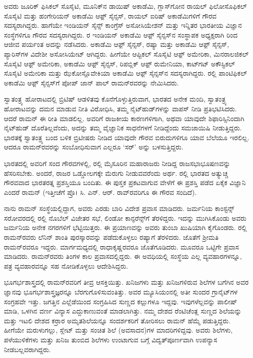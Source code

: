ಅವರು ಜೂರಿಕ್ ಫಿಸಿಕಲ್ ಸೊಸೈಟಿ, ಮೂನಿಕ್‌ನ ಡಾಯಿಷ್ ಅಕಾಡೆಮಿ, ಗ್ಲಾಸ್‌ಗೋನ ರಾಯಲ್ ಫಿಲೋಸೊಫಿಕಲ್ ಸೊಸೈಟಿ ಮತ್ತು ಹಂಗೇರಿಯನ್ ಅಕಾಡೆಮಿ ಆಫ಼್ ಸೈನ್ಸಸ್, ರಾಯಲ್ ಐರಿಷ್ ಅಕಾಡೆಮಿಗಳಿಗೆ ಗೌರವ ಸದಸ್ಯರಾಗಿದ್ದರು. ಹಾಗೆಯೇ ಇಂಡಿಯನ್ ಸೈನ್ಸ್ ಕಾಂಗ್ರೆಸ್ ಅಸೋಸಿಯೇಶನ್ ಮತ್ತು ಇನ್ನಿತರ ಭಾರತೀಯ ವಿಜ್ಞಾನ ಸಂಸ್ಥೆಗಳಿಗೂ ಗೌರವ ಸದಸ್ಯರಾಗಿದ್ದರು.  ರ ಇಂಡಿಯನ್ ಅಕಾಡೆಮಿ ಆಫ಼್ ಸೈನ್ಸಸ್‌ನ ಸಂಸ್ಥಾಪಕ ಅಧ್ಯಕ್ಷರಾಗಿ  ರಿಂದ ಆಜೀವ ಪರ್ಯಂತ ಅದನ್ನು ನಡೆಸಿದರು. ಅಕಾಡೆಮಿ ಆಫ಼್ ಸೈನ್ಸಸ್, ರಷ್ಯಾ ಮತ್ತು ಅಕಾಡೆಮಿ ಆಫ಼್ ಸೈನ್ಸಸ್, ಪ್ಯಾರಿಸ್‍ಗಳ ವಿದೇಶೀ ಅಸೋಸಿಯೇಟ್ ಆಗಿದ್ದರು. ಹೀಗೆಯೇ ಆಪ್ಟಿಕಲ್ ಸೊಸೈಟಿ ಆಫ಼್ ಅಮೇರಿಕಾ, ಮಿನರಾಲಜಿಕಲ್ ಸೊಸೈಟಿ ಆಫ಼್ ಅಮೇರಿಕಾ, ಅಕಾಡೆಮಿ ಆಫ಼್ ಸೈನ್ಸಸ್, ರಿಪಬ್ಲಿಕ್ ಆಫ಼್ ರುಮೇನಿಯಾ, ಕಾಟ್‍ಗಟ್ ಅಕೌಸ್ಟಿಕಲ್ ಸೊಸೈಟಿ ಅಮೇರಿಕಾ ಮತ್ತು ಝೆಕೋಸ್ಲೊವೇಕಿಯಾ ಅಕಾಡೆಮಿ ಆಫ಼್ ಸೈನ್ಸಸ್‌ನ ಸದಸ್ಯರಾಗಿದ್ದರು.  ರಲ್ಲಿ ಪಾಂಟಿಫಿಕಲ್ ಅಕಾಡೆಮಿ ಆಫ಼್ ಸೈನ್ಸಸ್‌ಗೆ ಪೋಪ್ ಜಾನ್ ಪಾಲ್ ರಾಮನ್‍ರವರನ್ನು ನೇಮಿಸಿದರು.

ಸ್ವಾತಂತ್ರ್ಯ ಹೋರಾಟದಲ್ಲಿ ಬ್ರಿಟಿಷ್ ಆಡಳಿತವು ಕೊನೆಗೊಳ್ಳುತ್ತಿರುವಾಗ, ಭಾರತದ ಅನೇಕ ಮಂದಿ, ಸ್ವಾತಂತ್ರ್ಯ ಹೋರಾಟವನ್ನು ದಮನ ಮಾಡುವ ನೀತಿ ವಿರೋಧಿಸಿ, ತಮ್ಮ ನೈಟ್‍ಹುಡ್‍‌ಗಳನ್ನು ವಾಪಸ್ ನೀಡಿ ಪ್ರತಿಭಟಿಸಿದರು. ಆದರೆ ರಾಮನ್‍ ಈ ರೀತಿ ಮಾಡಲಿಲ್ಲ. ಅವರಿಗೆ ರಾಜಕೀಯ ಕಾರಣಗಳಿಗಾಗಿ, ಅಥವಾ ಯಾವುದೇ ಶಿಫಾರಿಸ್ಸಿನಿಂದಾಗಿ ನೈಟ್‍ಹುಡ್ ದೊರೆತಿಲ್ಲವೆಂದು, ಅದನ್ನು ತಮ್ಮ ವೈಜ್ಞಾನಿಕ ಸಾಧನೆಗಳಗೆ ನೀಡಿದ್ದೆಂದು ಸಮಜಾಯಿಷಿ ನೀಡುತ್ತಿದ್ದರು. ಭಾರತಕ್ಕೆ ಸ್ವಾತಂತ್ರ್ಯ ಬಂದ ಬಳಿಕ ಬ್ರಿಟೀಷರು ನೀಡಿದ ಯಾವುದೇ ಗೌರವ ಬಿರುದುಗಳಿಗೂ ಯಾವ ಬೆಲೆಯೂ ಇರಲಿಲ್ಲ. ಆದರೂ ರಾಮನ್‍ರವರನ್ನು ಸಂಬೋಧಿಸುವಾಗ ಎಲ್ಲರೂ ‘ಸರ್‍’ ಅನ್ನು ಬಳಸುತ್ತಿದ್ದರು.

\newpage

ಭಾರತದಲ್ಲಿ ಅವರಿಗೆ ಸಂದ ಗೌರವಗಳಲ್ಲಿ,  ರಲ್ಲಿ ಮೈಸೂರಿನ ಮಹಾರಾಜರು ನೀಡಿದ್ದ \break ರಾಜಸಭಾಭೂಷಣವನ್ನು ಹೆಸರಿಸಬೇಕು. ಅಂದರೆ, ರಾಜರ ಒಡ್ಡೋಲಗಕ್ಕೇ ಮೆರುಗು ನೀಡುವವ\-ರೆಂದು ಅರ್ಥ. ರಲ್ಲಿ ಭಾರತದ ಅತ್ಯುಚ್ಚ ಗೌರವವಾದ ಭಾರತರತ್ನ ಪ್ರಶಸ್ತಿಯೂ ಬಂದಿತು. ಈ ಪುಸ್ತಕ ಪ್ರಕಟವಾಗುವ ವೇಳೆಗೆ ಈ ಪ್ರಶಸ್ತಿ ಪಡೆದ ಏಕೈಕ ವಿಜ್ಞಾನಿ ಎಂದರೆ ರಾಮನ್ (ಇತ್ತೀಚೆಗೆ ಪ್ರೊ। ಸಿ. ಎನ್. ಆರ್. ರಾವ್‌ರವರಿಗೂ ಈ ಗೌರವ ಸಂದಿದೆ).

ನಾನು ರಾಮನ್ ಸಂಸ್ಥೆಯಲ್ಲಿದ್ದಾಗ, ಅವರು ಎರಡು ಬಾರಿ ವಿದೇಶ ಪ್ರವಾಸ ಮಾಡಿದರು. ಜರ್ಮನಿಯ ಕಾಂಸ್ಟನ್ಸ್ ಸರೋವರದಲ್ಲಿ  ರಲ್ಲಿ ನೊಬೆಲ್ ವಿಜೇತರ ಸಭೆ, ಲಿಂಡೋ ಕಾನ್ಫರೆನ್ಸ್‌ಗೆ ತೆರಳಿದ್ದರು. ಇದನ್ನು ಮುಗಿಸಿಕೊಂಡು ಅವರು ಜರ್ಮನಿಯ ಅನೇಕ ನಗರಗಳಿಗೆ ಭೆಟ್ಟಿಯಿತ್ತರು. ಈ ಪ್ರಯಾಣವನ್ನು ಅವರು ತುಂಬಾ ಖುಷಿಯಾಗಿ ಕೈಗೊಂಡರು. ರಲ್ಲಿ ರಾಮನ್‍ರವರು ಲೆನಿನ್ ಶಾಂತಿ ಪುರಸ್ಕಾರವನ್ನು ಪಡೆದುಕೊಳ್ಳಲು ರಷ್ಯಾಗೆ ತೆರಳಿದರು. ಜೊತೆಗೆ ಶ‍್ರೀಮತಿ ರಾಮನ್‌ರವರೂ ಇದ್ದರು. ಮಾರ್ಗಮಧ‍್ಯದಲ್ಲಿ ರಾಧಾಕೃಷ್ಣರವರೂ ಜೊತೆಗೂಡಿದರು. ಮೂವರೂ ಒಟ್ಟಿಗೇ ಪ್ರವಾಸ ಮಾಡಿದರು. ರಾಮನ್‍ರವರು ತಿಂಗಳ ಕಾಲ ಪ್ರವಾಸದಲ್ಲಿದ್ದರು. ಈ ಅವಧಿಯಲ್ಲಿ ಸಂಸ್ಥೆಯ ಎಲ್ಲ ವ್ಯವಹಾರಗಳನ್ನೂ, ಪತ್ರ ವ್ಯವಹಾರವನ್ನೂ ಸಹ ನೋಡಿಕೊಳ್ಳಲು ಆದೇಶಿಸಿದ್ದರು.



ಭೂಗರ್ಭಶಾಸ್ತ್ರದಲ್ಲಿ ರಾಮನ್‍ರವರಿಗೆ ತೀವ್ರ ಆಸಕ್ತಿಯಿತ್ತು. ಖನಿಜಗಳು ಮತ್ತು ಖನಿಜ\-ಗಳಿರುವ ಶಿಲೆಗಳ ಬಗೆಗಿನ ಅವರ ಜ್ಞಾನವು ಭೂಗರ್ಭಶಾಸ್ತ್ರಜ್ಞರನ್ನೂ ಬೆರಗುಗೊಳಿಸುವಂತಿತ್ತು. ಅವರ ಮ್ಯೂಸಿಯಂನಲ್ಲಿ ಅತೀ ಸುಂದರ ಗ್ರಾನೈಟ್‌ಗಳ ಸಂಗ್ರಹವೇ ಇತ್ತು. ಜಗತ್ತಿನ ಎಲ್ಲೆಡೆಯಿಂದ ಸಂಗ್ರಹಿಸಿದ ಸುಣ್ಣದ ಕಲ್ಲುಗಳೂ ಇದ್ದವು. ಇವುಗಳೆಲ್ಲವನ್ನು ಪಾಲೀಷ್ ಮಾಡಿ, ಒಳಗಿನ ವರ್ಣ ವಿನ್ಯಾಸ ಎದ್ದುಕಾಣುವಂತೆ ಮಾಡಲಾಗಿತ್ತು. ನಮ್ಮ ದೇಶದ ರೆಂಟಿಚೆಂತ್ಲ ಸುಣ್ಣದ ಶಿಲೆಯನ್ನು ಮತ್ತು ಇಟಲಿ ದೇಶದ ಕರ್ರಾರ ಅಮೃತಶಿಲೆಯನ್ನೂ ಸಂದರ್ಶಕರಿಗೆ ತೋರಿಸಲು ರಾಮನ್ ಹೆಮ್ಮೆ ಪಡುತ್ತಿದ್ದರು. ಹೀಗೆಯೇ ಮರುಳುಗಲ್ಲು, ಸ್ಲೇಟ್ ಮತ್ತು ಸಂಚಿತ ಶಿಲೆ (ಅವಸಾದನ)ಗಳ ಮಾದರಿಗಳಿದ್ದವು. ಅವರು ಶಿಲೆಗಳು, ಪಳೆಯುಳಿಕೆಗಳು ಮತ್ತು ಖನಿಜ ತುಂಬಿದ ಶಿಲೆಗಳು ಉಂಟಾಗುವ ಬಗ್ಗೆ ವಿದ್ವತ್‍ಪೂರ್ಣವಾಗಿ ಉಪನ್ಯಾಸ ನೀಡಬಲ್ಲವರಾಗಿದ್ದರು.

